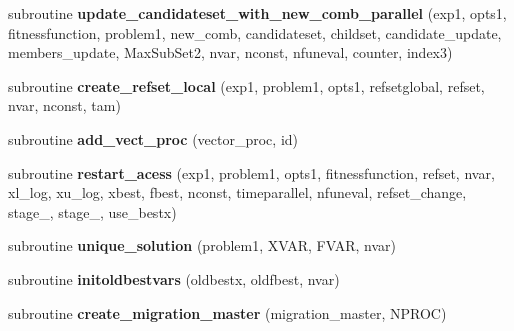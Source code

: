 \begin{DoxyCompactItemize}
\item 
\hypertarget{classparallelscattersearchfunctions_a505e721374a120cd61c36065c6ddc002}{subroutine {\bfseries update\-\_\-candidateset\-\_\-with\-\_\-new\-\_\-comb\-\_\-parallel} (exp1, opts1, fitnessfunction, problem1, new\-\_\-comb, candidateset, childset, candidate\-\_\-update, members\-\_\-update, Max\-Sub\-Set2, nvar, nconst, nfuneval, counter, index3)}\label{classparallelscattersearchfunctions_a505e721374a120cd61c36065c6ddc002}

\item 
\hypertarget{classparallelscattersearchfunctions_ad3089e0b6c31957a4242d007bb471414}{subroutine {\bfseries create\-\_\-refset\-\_\-local} (exp1, problem1, opts1, refsetglobal, refset, nvar, nconst, tam)}\label{classparallelscattersearchfunctions_ad3089e0b6c31957a4242d007bb471414}

\item 
\hypertarget{classparallelscattersearchfunctions_af8095b113bba40cbaad81d2d21f4e9a3}{subroutine {\bfseries add\-\_\-vect\-\_\-proc} (vector\-\_\-proc, id)}\label{classparallelscattersearchfunctions_af8095b113bba40cbaad81d2d21f4e9a3}

\item 
\hypertarget{classparallelscattersearchfunctions_a949ce2691ce90ef49a19f1415d27ee02}{subroutine {\bfseries restart\-\_\-acess} (exp1, problem1, opts1, fitnessfunction, refset, nvar, xl\-\_\-log, xu\-\_\-log, xbest, fbest, nconst, timeparallel, nfuneval, refset\-\_\-change, stage\-\_, stage\-\_, use\-\_\-bestx)}\label{classparallelscattersearchfunctions_a949ce2691ce90ef49a19f1415d27ee02}

\item 
\hypertarget{classparallelscattersearchfunctions_a0bb31634d817c638b9bf9c18c64d5c16}{subroutine {\bfseries unique\-\_\-solution} (problem1, X\-V\-A\-R, F\-V\-A\-R, nvar)}\label{classparallelscattersearchfunctions_a0bb31634d817c638b9bf9c18c64d5c16}

\item 
\hypertarget{classparallelscattersearchfunctions_a92fbe3ef006e1f8d10d28a01144630ad}{subroutine {\bfseries initoldbestvars} (oldbestx, oldfbest, nvar)}\label{classparallelscattersearchfunctions_a92fbe3ef006e1f8d10d28a01144630ad}

\item 
\hypertarget{classparallelscattersearchfunctions_a82a42c628c10da723e9da3f95509ce22}{subroutine {\bfseries create\-\_\-migration\-\_\-master} (migration\-\_\-master, N\-P\-R\-O\-C)}\label{classparallelscattersearchfunctions_a82a42c628c10da723e9da3f95509ce22}


\end{DoxyCompactItemize}
